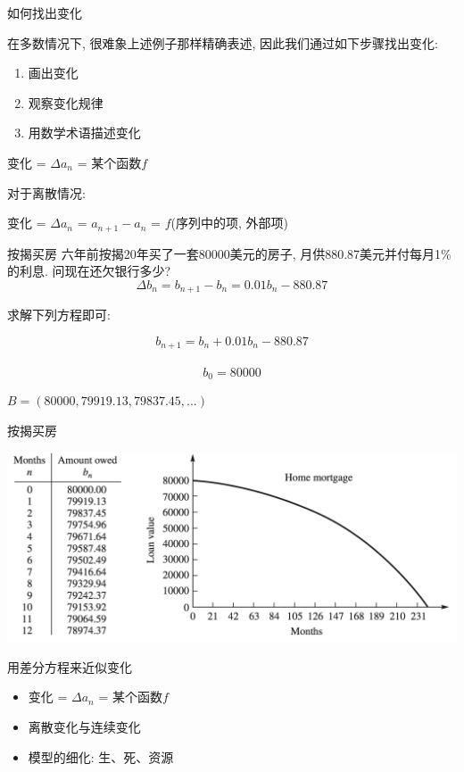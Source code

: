\documentclass[UTF8, mathserif]{ctexbeamer}
\begin{document}
\begin{frame}{如何找出变化}

在多数情况下, 很难象上述例子那样精确表述, 因此我们通过如下步骤找出变化:

\begin{enumerate}
\item 画出变化
\item 观察变化规律
\item 用数学术语描述变化
\end{enumerate}

变化 = $\Delta a_n$ = 某个函数$f$

对于离散情况:

变化 = $\Delta a_n$ = $a_{n+1} - a_n$ = $f$(序列中的项, 外部项)
\end{frame}

\begin{frame}{按揭买房}
六年前按揭20年买了一套80000美元的房子, 月供880.87美元并付每月1\%的利息. 问现在还欠银行多少?
\[
\Delta b_n = b_{n+1} - b_n = 0.01b_n - 880.87
\]

求解下列方程即可:

\begin{block}{}
\[
b_{n+1} = b_n + 0.01b_n - 880.87
\]\\[-25pt]
\[
b_0 = 80000
\]
\end{block}

$B = (80000, 79919.13, 79837.45, ...)$
\end{frame}

\begin{frame}{按揭买房}
  \begin{center}
    \includegraphics[width=.9\textwidth{}]{mort.png}
  \end{center}
\end{frame}

\begin{frame}{用差分方程来近似变化}

  \begin{itemize}
  \item 变化 = $\Delta a_n$ = 某个函数$f$
  \item 离散变化与连续变化
  \item 模型的细化: 生、死、资源
  \end{itemize}
\end{frame}
\end{document}
